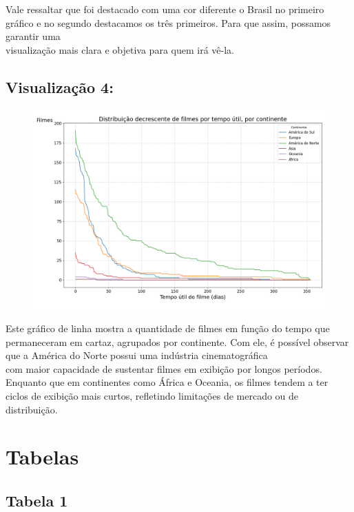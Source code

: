 \documentclass{article}
\begin{document}
Vale ressaltar que foi destacado com uma cor diferente o Brasil no primeiro gráfico e no segundo destacamos os três primeiros. Para que assim, possamos garantir uma\\
visualização mais clara e objetiva para quem irá vê-la.

\subsection*{Visualização 4:}
\begin{figure}[H]
    \centerline{\includegraphics[width = \linewidth]{img/Figure_4.png}}
\end{figure}

Este gráfico de linha mostra a quantidade de filmes em função do tempo que permaneceram em cartaz, agrupados por continente. Com ele, é possível observar que a América do Norte possui uma indústria cinematográfica\\
com maior capacidade de sustentar filmes em exibição por longos períodos. Enquanto que em continentes como África e Oceania, os filmes tendem a ter ciclos de exibição mais curtos, refletindo limitações de mercado ou de distribuição.

\section{Tabelas}

\subsection*{Tabela 1}
\end{document}
